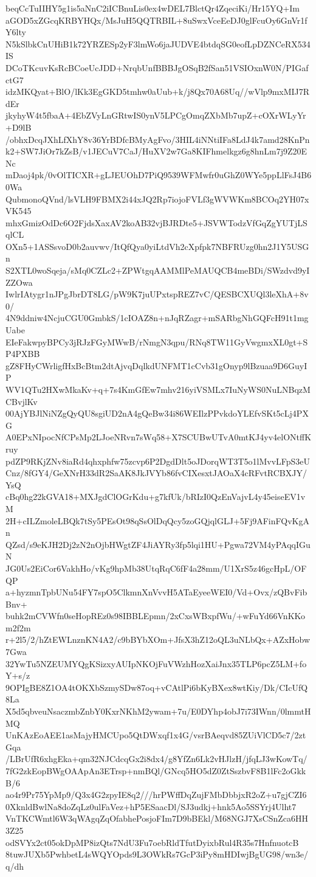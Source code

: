 beqCcTuIIHY5g1is5aNnC2iICBnuLis0ex4wDEL7BlctQr4ZqeciKi/Hr15YQ+Im
aGOD5xZGcqKRBYHQx/MsJuH5QQTRBIL+8uSwxVceEeDJ0glFcuOy6GnVr1fY6lty
N5kSlbkCnUHiB1k72YRZESp2yF3lmWo6jaJUDVE4btdqSG0eofLpDZNCeRX534IS
DCoTKcuvKsRcBCoeUcJDD+NrqbUnfBBBJgOSqB2fSan51VSIOxnW0N/PIGafctG7
idzMKQyat+BlO/lKk3EgGKD5tmhw0aUub+k/j8Qx70A68Uq//wVlp9mxMIJ7RdEr
jkyhyW4t5fbaA+4EbZVyLnGRtwIS0ynV5LPCgOmqZXbMb7upZ+cOXrWLyYr+D9lB
/obhxDcqJXhLfXhY8v36YrBDfcBMyAgFvo/3HIL4iNNtiIFa8LdJ4k7amd28KnPn
k2+SW7JiOr7kZsB/v1JECuV7CaJ/HuXV2w7Ga8KIFhmelkgz6g8hnLm7j9Z20ENc
mDaoj4pk/0vOlTICXR+gLJEUOhD7PiQ9539WFMwfr0uGhZ0WYe5ppLlFsJ4B60Wa
QubmonoQVnd/lsVLH9FBMX2i44xJQ2Rp7iojoFVLf3gWVWKm8BCOq2YH07xVK545
mhxGmizOdDc6O2FjdsXaxAV2koAB32vjBJRDte5+JSVWTodzVfGqZgYUTjLSqlCL
OXn5+1ASSsvoD0b2auvwv/ItQfQya0yiLtdVh2cXpfpk7NBFRUzg0hn2J1Y5USGn
S2XTL0woSqeja/sMq0CZLc2+ZPWtgqAAMMlPeMAUQCB4meBDi/SWzdvd9yIZZOwa
IwlrIAtygr1nJPgJbrDT8LG/pW9K7juUPxtspREZ7vC/QESBCXUQl3leXhA+8v0/
4N9ddniw4NcjuCGU0GmbkS/1cIOAZ8n+nJqRZagr+mSARbgNhGQFcH91t1mgUabe
EIeFakwpyBPCy3jRJzFGyMWwB/rNmgN3qpu/RNq8TW11GyVwgmxXL0gt+SP4PXBB
gZ8FHyCWrligfHxBcBtm2dtAjvqDqlkdUNFMT1cCvb31gOnyp9lBzuaa9D6GuyIP
WV1QTu2HXwMkaKv+q+7s4KmGfEw7mhv216yiVSMLx7IuNyWS0NuLNBqzMCBvjlKv
00AjYBJlNiNZgQyQU8sgiUD2nA4gQeBw34i86WEIlzPPvkdoYLEfvSKt5cLj4PXG
A0EPxNIpocNfCPsMp2LJoeNRvn7sWq58+X7SCUBwUTvA0mtKJ4yv4elONtffKruy
pdZP9RKjZNv8iaRd4qhxphfw75zcvp6P2DgdDlt5oJDorqWT3T5o1lMvvLFpS3eU
Cnz/8fGY4/GeXNrH33dR2SaAK8JkJVYb86fvCIXesxtJAOaX4cRFvtRCBXJY/YsQ
cBq0hg22kGVA18+MXJgdClOGrKdu+g7kfUk/bRIzI0QzEnVajvL4y45eiseEV1vM
2H+cILZmoleLBQk7tSy5PEsOt98qSsOlDqQcy5zoGQjqlGLJ+5Fj9AFinFQvKgAn
QZsd/s9eKJH2Dj2zN2nOjbHWgtZF4JiAYRy3fp5lqi1HU+Pgwa72VM4yPAqqIGuN
JG0Us2EiCor6VakhHo/vKg9hpMb38UtqRqC6fF4a28mm/U1XrS5z46gcHpL/OFQP
a+hyzmnTpbUNu54FY7spO5ClkmnXnVvvH5ATaEyeeWEI0/Vd+Ovx/zQBvFibBnv+
buhk2mCVWfn0seHopREz0s98IBBLEpmn/2xCxsWBxpfWu/+wFuYd66VnKKom2f2m
r+2l5/2/hZtEWLnznKN4A2/c9bBYbXOm+JfsX3hZ12oQL3uNLbQx+AZxHobw7Gwa
32YwTu5NZEUMYQgKSizxyAUIpNKOjFuVWzhHozXaiJnx35TLP6pcZ5LM+foY+s/z
9OPIgBE8Z1OA4tOKXbSzmySDw87oq+vCAtlPi6bKyBXex8wtKiy/Dk/CIcUfQ8La
X5d5qbveuNsaczmbZnbY0KxrNKhM2ywam+7u/E0DYhp4obJ7i73IWnn/0lmmtHMQ
UnKAzEoAEE1asMajyHMCUpo5QtDWxqf1x4G/vsrBAeqvd85ZUiVlCD5c7/2ztGqa
/LBrUfR6xhgEka+qm32NJCdcqGx2i8dx4/g8YfZn6Lk2vHJlzH/jfqLJ3wKowTq/
7fG2zkEopBWgOAApAn3ETrsp+nmBQl/GNcq5HO5dZ0ZtSszbvF8B1lFc2oGkkB/6
ao4r9Pr75YpMp9/Q3x4G2zpyIE8q2///hrPWffDqZujFMbDbbjxR2oZ+u7gjCZI6
0XknldBwlNa8doZqLz0ulFaVez+hP5ESaacDl/SJ3udkj+hnk5Ao5SSYrj4Ulht7
VnTKCWmtl6W3qWAgqZqOfabhePosjoFIm7D9bBEkl/M68NGJ7XsCSnZca6HH3Z25
odSVYx2ct05okDpMP8izQts7NdU3Fu7oebRldTfutDyixbRul4R35s7HnfnuotcB
8tuwJUXb5PwhbetL4sWQYOpds9L3OWkRs7GcP3iPy8mHDIwjBgUG98/wn3e/q/dh
